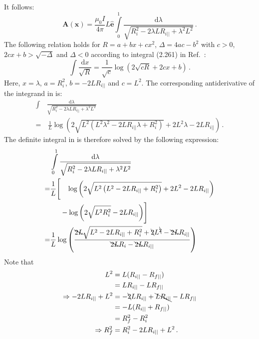It follows:
\begin{equation}
 \mathbf{A}(\mathbf{x})
 = \frac{\mu_0 I}{4 \pi} L \hat{\mathbf{e}} \int\limits_0^1 \frac{\mathrm{d}\lambda}{\sqrt{R_i^2 - 2 \lambda L R_{i ||} + \lambda^2 L^2}} \, . \label{eqn:A_integral}
\end{equation}
The following relation holds for
$R = a + bx + cx^2$,
$\Delta = 4 a c - b^2$ with
$c > 0$, $2 c x + b > \sqrt{- \Delta}$ and $\Delta < 0$
according to integral (2.261) in Ref.~\cite{gradshteyn_ryzhik}:
\begin{equation}
 \int \frac{\mathrm{d}x}{\sqrt{R}} = \frac{1}{\sqrt{c}} \log \left( 2 \sqrt{c R} + 2 c x + b \right) \, .
\end{equation}
Here, $x = \lambda$, $a=R_i^2$, $b=-2 L R_{i ||}$ and $c = L^2$.
The corresponding antiderivative of the integrand in  is:
\begin{align}
 \int&\frac{\mathrm{d}\lambda}{\sqrt{R_i^2 - 2 \lambda L R_{i ||} + \lambda^2 L^2}} \nonumber \\
 =&\, \frac{1}{L} \log \left( 2 \sqrt{L^2\left( L^2 \lambda^2 - 2 L R_{i ||} \lambda + R_i^2 \right)} + 2 L^2 \lambda - 2 L R_{i ||} \right) \, .
\end{align}
The definite integral in  is therefore solved by the following expression:
\begin{align}
 ~ & \int\limits_0^1 \frac{\mathrm{d}\lambda}{\sqrt{R_i^2 - 2 \lambda L R_{i ||} + \lambda^2 L^2}} \\
 = & \frac{1}{L} \Biggl[\phantom{-}\, \log \left( 2 \sqrt{L^2\left( L^2 - 2 L R_{i ||} + R_i^2 \right)} + 2 L^2 - 2 L R_{i ||} \right) \nonumber \\
 ~ & \phantom{\frac{1}{L} \Biggl[} - \log \left( 2 \sqrt{L^2 R_i^2 } - 2 L R_{i ||} \right) \Biggr] \\
 = & \frac{1}{L} \log \left( \frac{ \bcancel{2 L} \sqrt{L^2 - 2 L R_{i ||} + R_i^2} + \bcancel{2} L^{\bcancel{2}} - \bcancel{2 L} R_{i ||} }{ \bcancel{2 L} R_i - \bcancel{2 L} R_{i ||} } \right)
\end{align}
Note that
\begin{align}
                             L^2 & = L (R_{i ||} - R_{f ||} ) \\
                              ~  & = L R_{i ||} - L R_{f ||} \\
\Rightarrow -2 L R_{i ||} + L^2  & = - \bcancel{2} L R_{i ||}  + \bcancel{L R_{i ||}} - L R_{f ||} \\
                              ~  & = -L (R_{i ||} + R_{f ||} ) \\
                              ~  & = R_f^2 - R_i^2 \\
\Rightarrow                R_f^2 & = R_i^2 -2 L R_{i ||} + L^2 \, .
\end{align}
